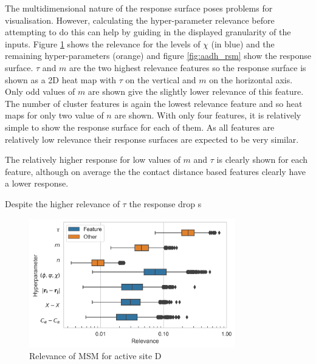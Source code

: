 The multidimensional nature of the response surface poses problems for visualisation. However, calculating the hyper-parameter relevance before attempting to do this can help by guiding in the displayed granularity of the inputs. Figure \ref{fig:aadh_relevance} shows the relevance for the levels of $\chi$ (in blue) and the remaining hyper-parameters (orange) and figure \ref{fig:aadh_rsm} show the response surface. $\tau$ and $m$ are the two highest relevance features so the response surface is shown as a 2D heat map with $\tau$ on the vertical and $m$ on the horizontal axis. Only odd values of $m$ are shown give the slightly lower relevance of this feature. The number of cluster features is again the lowest relevance feature and so heat maps for only two value of $n$ are shown. With only four features, it is relatively simple to show the response surface for each of them. As all features are relatively low relevance their response surfaces are expected to be very similar. 

The relatively higher response for low values of $m$ and $\tau$ is clearly shown for each feature, although on average the the contact distance based features clearly have a lower response. 

Despite the higher relevance of $\tau$ the response drop s

\begin{figure}[ht]
    \centering
    \caption{Relevance of MSM for active site D}
    \includegraphics[width=0.8\textwidth]{chapters/msm_optimization/figures/AADH_relevance_d.png}
    
    \label{fig:aadh_relevance}
\end{figure}

